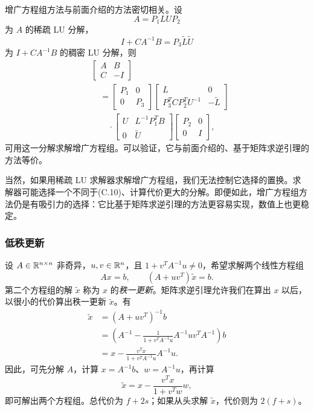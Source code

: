 增广方程组方法与前面介绍的方法密切相关。设
\[
 A=P_1LUP_2
\]
为 $A$ 的稀疏 LU 分解，
\[
 I+CA^{-1}B=P_3\widetilde L\widetilde U
\]
为 $I+CA^{-1}B$ 的稠密 LU 分解，则
\begin{equation}
 \begin{aligned}
 &\begin{bmatrix}A&B\\C&-I\end{bmatrix}\\
 &\quad=\begin{bmatrix}P_1&0\\0&P_3\end{bmatrix}
 \begin{bmatrix}L&0\\P_3^TCP_2^TU^{-1}&-\widetilde L\end{bmatrix}\\
 &\qquad\cdot\begin{bmatrix}U&L^{-1}P_1^TB\\0&\widetilde U\end{bmatrix}
 \begin{bmatrix}P_2&0\\0&I\end{bmatrix},
 \end{aligned}\tag{C.10}
\end{equation}
可用这一分解求解增广方程组。可以验证，它与前面介绍的、基于矩阵求逆引理的方法等价。

当然，如果用稀疏 LU 求解器求解增广方程组，我们无法控制它选择的置换。求解器可能选择一个不同于(C.10)、计算代价更大的分解。即便如此，增广方程组方法仍是有吸引力的选择：它比基于矩阵求逆引理的方法更容易实现，数值上也更稳定。

\subsubsection*{低秩更新}
设 $A\in\mathbb R^{n\times n}$ 非奇异，$u,v\in\mathbb R^n$，且 $1+v^TA^{-1}u\neq0$，希望求解两个线性方程组
\[
 Ax=b,\qquad(A+uv^T)\widetilde x=b.
\]
第二个方程组的解 $\widetilde x$ 称为 $x$ 的\emph{秩一更新}。矩阵求逆引理允许我们在算出 $x$ 以后，以很小的代价算出秩一更新 $\widetilde x$。有
\begin{align*}
 \widetilde x&=(A+uv^T)^{-1}b\\
 &=\left(A^{-1}-\frac1{1+v^TA^{-1}u}A^{-1}uv^TA^{-1}\right)b\\
 &=x-\frac{v^Tx}{1+v^TA^{-1}u}A^{-1}u.
\end{align*}
因此，可先分解 $A$，计算 $x=A^{-1}b$、$w=A^{-1}u$，再计算
\[
 \widetilde x=x-\frac{v^Tx}{1+v^Tw}w,
\]
即可解出两个方程组。总代价为 $f+2s$；如果从头求解 $\widetilde x$，代价则为 $2(f+s)$。

